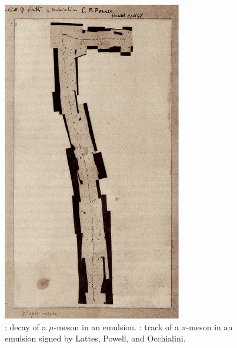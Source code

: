 \begin{figure}
\begin{minipage}{\linewidth}
			\includegraphics[width=.8\linewidth]{fig/chapt2/pion-emulsion.pdf}
			\subcaption{\label{fig:emulsions:B}}
		\end{minipage}
		\caption{\label{fig:emulsions} : decay of a $\mu$-meson in an emulsion. : track of a $\pi$-meson in an emulsion signed by Lattes, Powell, and Occhialini.}
		\vspace{-5pt}
	\end{figure}
	
